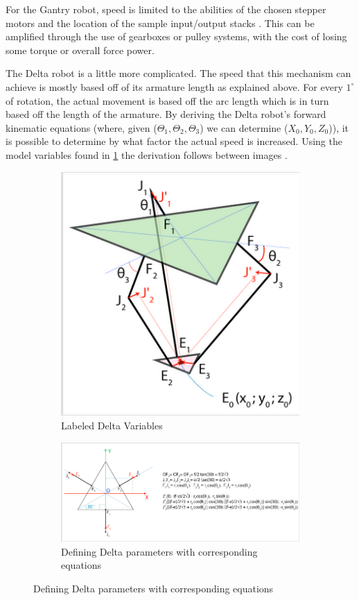 \documentclass[11pt]{article}
\begin{document}
For the Gantry robot, speed is limited to the abilities of the chosen stepper motors and the location of the sample input/output stacks \cite{Cartisian_Design}. This can be amplified through the use of gearboxes or pulley systems, with the cost of losing some torque or overall force power. 

The Delta robot is a little more complicated. The speed that this mechanism can achieve is mostly based off of its armature length as explained above. For every $1^\circ$ of rotation, the actual movement is based off the arc length which is in turn based off the length of the armature. By deriving the Delta robot's forward kinematic equations (where, given ($\Theta_1, \Theta_2, \Theta_3$) we can determine ($X_0, Y_0, Z_0$)), it is possible to determine by what factor the actual speed is increased. Using the model variables found in \ref{fig:Delta_Label} the derivation follows between images \cite{TrossenRobotics}.

    \begin{figure}[H]
    \centering
    \begin{subfigure}{.5\textwidth}
      \centering
      \includegraphics[width=.7\linewidth]{Delta_Labeld.png}
      \caption{Labeled Delta Variables}
      \label{fig:Delta_Label}
    \end{subfigure}%
    \begin{subfigure}{.5\textwidth}
      \centering
      \includegraphics[width=.7\linewidth]{Delta_math_fig.png}
      \caption{Defining Delta parameters with corresponding equations}
      \label{fig:Delta_math_fig}
    \end{subfigure}
    \label{fig:test}
    \end{figure}
    
\end{document}
